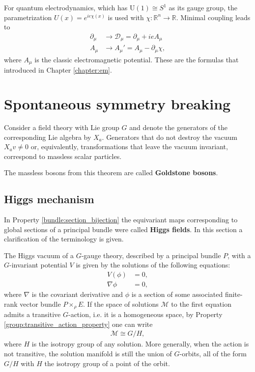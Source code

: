     \begin{example}[QED]
        For quantum electrodynamics, which has $\mathrm{U}(1)\cong S^1$ as its gauge group, the parametrization $U(x) = e^{ie\chi(x)}$ is used with $\chi:\mathbb{R}^n\rightarrow\mathbb{R}$. Minimal coupling leads to
        \begin{align}
            \partial_\mu &\longrightarrow\mathcal{D}_\mu = \partial_\mu + ieA_\mu\\
            A_\mu &\longrightarrow A_\mu' = A_\mu - \partial_\mu\chi,
        \end{align}
        where $A_\mu$ is the classic electromagnetic potential. These are the formulas that introduced in Chapter \ref{chapter:em}.
    \end{example}

\section{Spontaneous symmetry breaking}

    \begin{theorem}[Goldstone]
        Consider a field theory with Lie group $G$ and denote the generators of the corresponding Lie algebra by $X_a$. Generators that do not destroy the vacuum $X_av\neq0$ or, equivalently, transformations that leave the vacuum invariant, correspond to massless scalar particles.
    \end{theorem}
    The massless bosons from this theorem are called \textbf{Goldstone bosons}.

\subsection{Higgs mechanism}

    In Property \ref{bundle:section_bijection} the equivariant maps corresponding to global sections of a principal bundle were called \textbf{Higgs fields}. In this section a clarification of the terminology is given.

    The Higgs vacuum of a $G$-gauge theory, described by a principal bundle $P$, with a $G$-invariant potential $V$ is given by the solutions of the following equations:
    \begin{align}
        V(\phi) &= 0,\\
        \nabla\phi &= 0,
    \end{align}
    where $\nabla$ is the covariant derivative and $\phi$ is a section of some associated finite-rank vector bundle $P\times_\rho E$. If the space of solutions $\mathcal{M}$ to the first equation admits a transitive $G$-action, i.e. it is a homogeneous space, by Property \ref{group:transitive_action_property} one can write
    \begin{gather}
        \mathcal{M}\cong G/H,
    \end{gather}
    where $H$ is the isotropy group of any solution. More generally, when the action is not transitive, the solution manifold is still the union of $G$-orbits, all of the form $G/H$ with $H$ the isotropy group of a point of the orbit.

